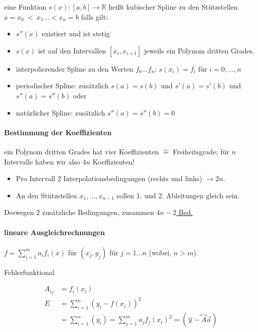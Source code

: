 \documentclass[a4paper,ngerman]{scrbook}
\newcommand{\R}{\ensuremath{\mathds{R}}}%
\begin{document}
eine Funktion $s(x)\colon [a,b] \to \R$ heißt kubischer Spline zu den Stützstellen $a=x_0~<~x_1\dots < x_n=b$ falls gilt:
\begin{itemize}
\item $s''(x)$ existiert und ist stetig
\item $s(x)$ ist auf den Intervallen $[x_i,x_{i+1}]$ jeweils ein Polynom dritten Grades.
\item interpolierender Spline zu den Werten $f_0\dots f_n$: $s(x_i) = f_i$ für $i=0,\dots,n$
\item periodischer Spline: zusätzlich $s(a) = s(b)$ und $s'(a) = s'(b)$ und $s''(a) = s''(b)$ oder
\item natürlicher Spline: zusätzlich $s''(a) = s''(b) = 0$
\end{itemize}

\paragraph{Bestimmung der Koeffizienten}

ein Polynom dritten Grades hat vier Koeffizienten $\hat{=}$ Freiheitsgrade; für $n$ Intervalle haben wir also $4n$ Koeffizienten!

\begin{itemize}
\item Pro Intervall 2 Interpolationsbedingungen (rechts und links) $\to 2n$.
\item An den Stützstellen $x_1,\dots,x_{n-1}$ sollen 1\@. und 2\@. Ableitungen gleich sein.
\end{itemize}

Deswegen 2 zusätzliche Bedingungen, zusammen \underline{$4n-2$ Bed.}


\paragraph{lineare Ausgleichrechnungen}

$f = \sum_{i=1}^{m} a_i f_i (x)$ für $(x_j, y_j)$ für $j = 1\dots n$
(wobei, $n > m$).

Fehlerfunktional

\begin{align*}
  A_{ij} &= f_i(x_i)\\
  E &= \sum_{i=1}^{n} (y_i - f(x_i))^2\\
  &= \sum_{i=1}^{n} (y_i) = \sum_{j=1}^{m} a_j f_j (x_i)^2 = (\overset{\rightharpoonup}{y} - \overset{\leftrightarrow}{A} \vec{a})
\end{align*}
\end{document}
